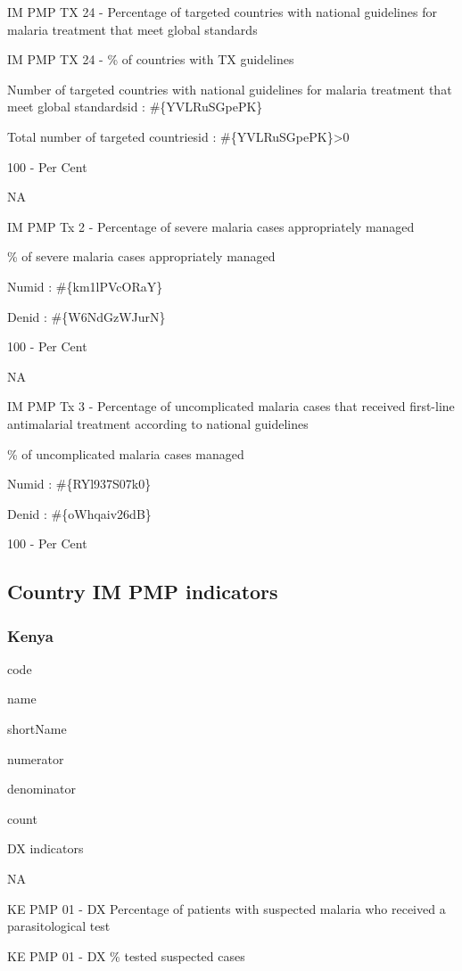 \documentclass[]{book}
\begin{document}
IM PMP TX 24 - Percentage of targeted countries with national guidelines for malaria treatment that meet global standards

IM PMP TX 24 - \% of countries with TX guidelines

Number of targeted countries with national guidelines for malaria treatment that meet global standardsid : \#\{YVLRuSGpePK\}

Total number of targeted countriesid : \#\{YVLRuSGpePK\}\textgreater{}0

100 - Per Cent

NA

IM PMP Tx 2 - Percentage of severe malaria cases appropriately managed

\% of severe malaria cases appropriately managed

Numid : \#\{km1lPVcORaY\}

Denid : \#\{W6NdGzWJurN\}

100 - Per Cent

NA

IM PMP Tx 3 - Percentage of uncomplicated malaria cases that received first-line antimalarial treatment according to national guidelines

\% of uncomplicated malaria cases managed

Numid : \#\{RYl937S07k0\}

Denid : \#\{oWhqaiv26dB\}

100 - Per Cent

\hypertarget{country-ind}{%
\subsection{Country IM PMP indicators}\label{country-ind}}

\hypertarget{kenya}{%
\subsubsection{Kenya}\label{kenya}}

code

name

shortName

numerator

denominator

count

DX indicators

NA

KE PMP 01 - DX Percentage of patients with suspected malaria who received a parasitological test

KE PMP 01 - DX \% tested suspected cases
\end{document}

